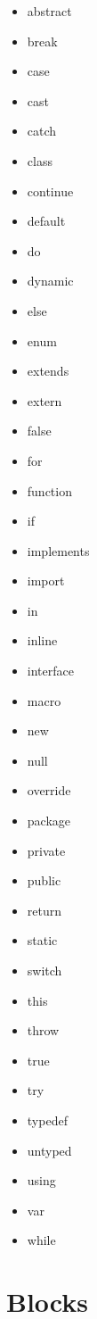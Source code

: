 \begin{itemize}
	\item abstract
	\item break
	\item case
	\item cast
	\item catch
	\item class
	\item continue
	\item default
	\item do
	\item dynamic
	\item else
	\item enum
	\item extends
	\item extern
	\item false
	\item for
	\item function
	\item if
	\item implements
	\item import
	\item in
	\item inline
	\item interface
	\item macro
	\item new
	\item null
	\item override
	\item package
	\item private
	\item public
	\item return
	\item static
	\item switch
	\item this
	\item throw
	\item true
	\item try
	\item typedef
	\item untyped
	\item using
	\item var
	\item while
\end{itemize}

\section{Blocks}
\label{expression-block}

